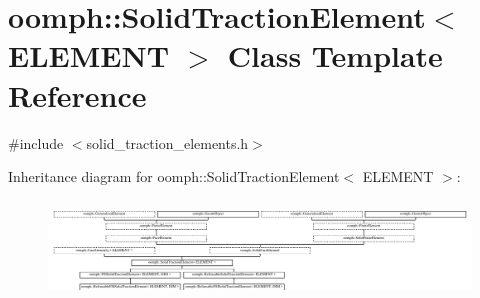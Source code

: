 \hypertarget{classoomph_1_1SolidTractionElement}{}\section{oomph\+:\+:Solid\+Traction\+Element$<$ E\+L\+E\+M\+E\+NT $>$ Class Template Reference}
\label{classoomph_1_1SolidTractionElement}


{\ttfamily \#include $<$solid\+\_\+traction\+\_\+elements.\+h$>$}

Inheritance diagram for oomph\+:\+:Solid\+Traction\+Element$<$ E\+L\+E\+M\+E\+NT $>$\+:\begin{figure}[H]
\begin{center}
\leavevmode
\includegraphics[height=2.620321cm]{classoomph_1_1SolidTractionElement}
\end{center}
\end{figure}
